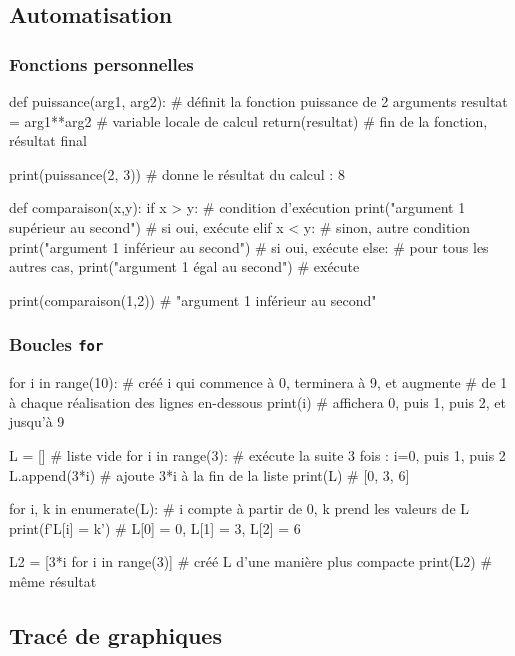 \documentclass[a4paper, 12pt, garamond]{book}
\begin{document}
\subsection{Automatisation}
\subsubsection{Fonctions personnelles}
\begin{python}
def puissance(arg1, arg2): # définit la fonction puissance de 2 arguments
    resultat = arg1**arg2  # variable locale de calcul
    return(resultat)       # fin de la fonction, résultat final

print(puissance(2, 3))     # donne le résultat du calcul : 8

def comparaison(x,y):
    if x > y:                                    # condition d'exécution
        print("argument 1 supérieur au second")  # si oui, exécute
    elif x < y:                                  # sinon, autre condition
        print("argument 1 inférieur au second")  # si oui, exécute
    else:                                        # pour tous les autres cas,
        print("argument 1 égal au second")       # exécute

print(comparaison(1,2))    # "argument 1 inférieur au second"
\end{python}

\subsubsection{Boucles \texttt{for}}
\begin{python}
for i in range(10):   # créé i qui commence à 0, terminera à 9, et augmente
                      # de 1 à chaque réalisation des lignes en-dessous
    print(i)          # affichera 0, puis 1, puis 2, et jusqu'à 9

L = []                # liste vide
for i in range(3):    # exécute la suite 3 fois : i=0, puis 1, puis 2
    L.append(3*i)     # ajoute 3*i à la fin de la liste
print(L)              # [0, 3, 6]

for i, k in enumerate(L):  # i compte à partir de 0, k prend les valeurs de L
    print(f'L[{i}] = {k}') # L[0] = 0, L[1] = 3, L[2] = 6

L2 = [3*i for i in range(3)] # créé L d'une manière plus compacte
print(L2)                    # même résultat
\end{python}

\subsection{Tracé de graphiques}
\end{document}
